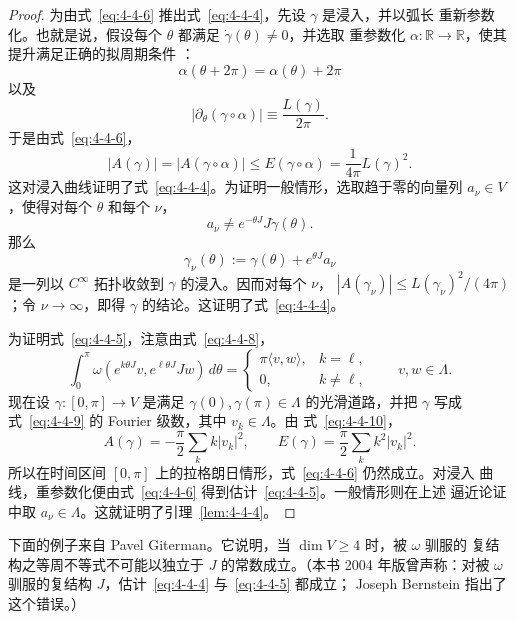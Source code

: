 \begin{proof}
为由式~\eqref{eq:4-4-6} 推出式~\eqref{eq:4-4-4}，先设 $\gamma$ 是浸入，并以弧长
重新参数化。也就是说，假设每个 $\theta$ 都满足 $\dot\gamma(\theta)\ne0$，并选取
重参数化 $\alpha:\mathbb R\to\mathbb R$，使其提升满足正确的拟周期条件
：
\[
  \alpha(\theta+2\pi)=\alpha(\theta)+2\pi
\]
以及
\[
  |\partial_\theta(\gamma\circ\alpha)|\equiv\frac{L(\gamma)}{2\pi}.
\]
于是由式~\eqref{eq:4-4-6}，
\[
  |A(\gamma)|=|A(\gamma\circ\alpha)|
  \le E(\gamma\circ\alpha)
  =\frac1{4\pi}L(\gamma)^2.
\]
这对浸入曲线证明了式~\eqref{eq:4-4-4}。为证明一般情形，选取趋于零的向量列
$a_\nu\in V$，使得对每个 $\theta$ 和每个 $\nu$，
\[
  a_\nu\ne e^{-\theta J}J\dot\gamma(\theta).
\]
那么
\[
  \gamma_\nu(\theta):=\gamma(\theta)+e^{\theta J}a_\nu
\]
是一列以 $C^\infty$ 拓扑收敛到 $\gamma$ 的浸入。因而对每个 $\nu$，
$|A(\gamma_\nu)|\le L(\gamma_\nu)^2/(4\pi)$；令 $\nu\to\infty$，即得 $\gamma$
的结论。这证明了式~\eqref{eq:4-4-4}。

为证明式~\eqref{eq:4-4-5}，注意由式~\eqref{eq:4-4-8}，
\begin{equation}\label{eq:4-4-10}
  \int_0^\pi\omega(e^{k\theta J}v,e^{\ell\theta J}Jw)\,d\theta
  =
  \begin{cases}
    \pi\langle v,w\rangle,&k=\ell,\\
    0,&k\ne\ell,
  \end{cases}
  \qquad v,w\in\Lambda.
\end{equation}
现在设 $\gamma:[0,\pi]\to V$ 是满足
$\gamma(0),\gamma(\pi)\in\Lambda$ 的光滑道路，并把 $\gamma$ 写成
式~\eqref{eq:4-4-9} 的 Fourier 级数，其中 $v_k\in\Lambda$。由
式~\eqref{eq:4-4-10}，
\[
  A(\gamma)=-\frac\pi2\sum_k k|v_k|^2,
  \qquad
  E(\gamma)=\frac\pi2\sum_k k^2|v_k|^2.
\]
所以在时间区间 $[0,\pi]$ 上的拉格朗日情形，式~\eqref{eq:4-4-6} 仍然成立。对浸入
曲线，重参数化便由式~\eqref{eq:4-4-6} 得到估计~\eqref{eq:4-4-5}。一般情形则在上述
逼近论证中取 $a_\nu\in\Lambda$。这就证明了引理~\ref{lem:4-4-4}。
\end{proof}

下面的例子来自 Pavel Giterman。它说明，当 $\dim V\ge4$ 时，被 $\omega$ 驯服的
复结构之等周不等式不可能以独立于 $J$ 的常数成立。（本书 2004 年版曾声称：对被
$\omega$ 驯服的复结构 $J$，估计~\eqref{eq:4-4-4} 与~\eqref{eq:4-4-5} 都成立；
Joseph Bernstein 指出了这个错误。）

